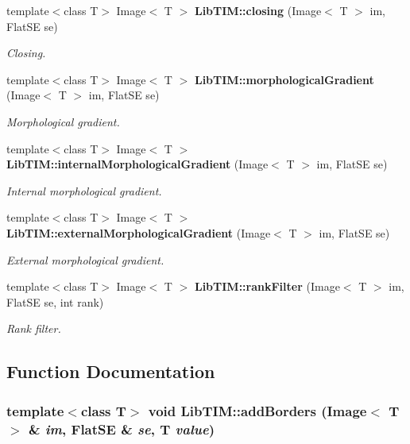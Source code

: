 \begin{CompactItemize}
template$<$class T$>$ Image$<$ T $>$ {\bf Lib\-TIM::closing} (Image$<$ T $>$ im, Flat\-SE se)
\begin{CompactList}\small\item\em Closing. \item\end{CompactList}\item 
template$<$class T$>$ Image$<$ T $>$ {\bf Lib\-TIM::morphological\-Gradient} (Image$<$ T $>$ im, Flat\-SE se)
\begin{CompactList}\small\item\em Morphological gradient. \item\end{CompactList}\item 
template$<$class T$>$ Image$<$ T $>$ {\bf Lib\-TIM::internal\-Morphological\-Gradient} (Image$<$ T $>$ im, Flat\-SE se)
\begin{CompactList}\small\item\em Internal morphological gradient. \item\end{CompactList}\item 
template$<$class T$>$ Image$<$ T $>$ {\bf Lib\-TIM::external\-Morphological\-Gradient} (Image$<$ T $>$ im, Flat\-SE se)
\begin{CompactList}\small\item\em External morphological gradient. \item\end{CompactList}\item 
template$<$class T$>$ Image$<$ T $>$ {\bf Lib\-TIM::rank\-Filter} (Image$<$ T $>$ im, Flat\-SE se, int rank)
\begin{CompactList}\small\item\em Rank filter. \item\end{CompactList}\end{CompactItemize}


\subsection{Function Documentation}
\subsubsection{\setlength{\rightskip}{0pt plus 5cm}template$<$class T$>$ void Lib\-TIM::add\-Borders (Image$<$ T $>$ \& {\em im}, Flat\-SE \& {\em se}, T {\em value})}\label{group__basisFunctions_ga1}


